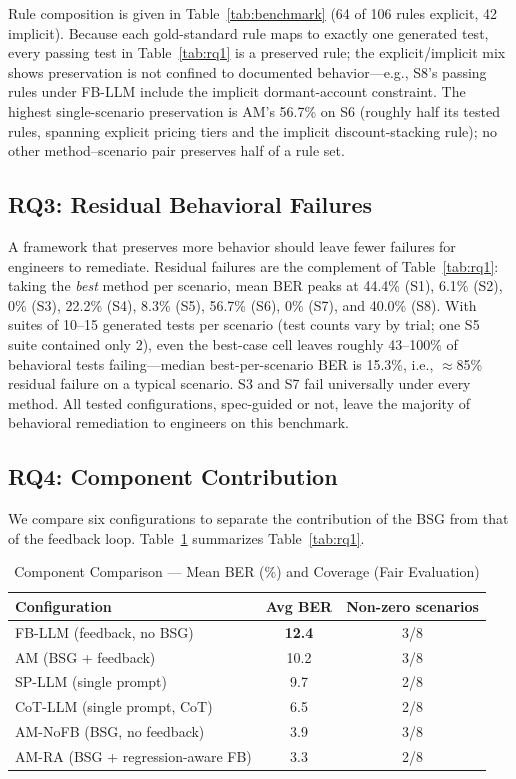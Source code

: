 \documentclass[conference]{IEEEtran}
\begin{document}
Rule composition is given in Table~\ref{tab:benchmark} (64 of 106 rules explicit, 42 implicit). Because each gold-standard rule maps to exactly one generated test, every passing test in Table~\ref{tab:rq1} is a preserved rule; the explicit/implicit mix shows preservation is not confined to documented behavior---e.g., S8's passing rules under FB-LLM include the implicit dormant-account constraint. The highest single-scenario preservation is AM's 56.7\% on S6 (roughly half its tested rules, spanning explicit pricing tiers and the implicit discount-stacking rule); no other method--scenario pair preserves half of a rule set.

\subsection{RQ3: Residual Behavioral Failures}

A framework that preserves more behavior should leave fewer failures for engineers to remediate. Residual failures are the complement of Table~\ref{tab:rq1}: taking the \emph{best} method per scenario, mean BER peaks at 44.4\% (S1), 6.1\% (S2), 0\% (S3), 22.2\% (S4), 8.3\% (S5), 56.7\% (S6), 0\% (S7), and 40.0\% (S8). With suites of 10--15 generated tests per scenario (test counts vary by trial; one S5 suite contained only 2), even the best-case cell leaves roughly 43--100\% of behavioral tests failing---median best-per-scenario BER is 15.3\%, i.e., $\approx$85\% residual failure on a typical scenario. S3 and S7 fail universally under every method. All tested configurations, spec-guided or not, leave the majority of behavioral remediation to engineers on this benchmark.

\subsection{RQ4: Component Contribution}

We compare six configurations to separate the contribution of the BSG from that of the feedback loop. Table~\ref{tab:rq4} summarizes Table~\ref{tab:rq1}.

\begin{table}[htbp]
\caption{Component Comparison --- Mean BER (\%) and Coverage (Fair Evaluation)}
\label{tab:rq4}
\centering
\footnotesize
\begin{tabular}{@{}lcc@{}}
\toprule
\textbf{Configuration} & \textbf{Avg BER} & \textbf{Non-zero scenarios} \\
\midrule
FB-LLM (feedback, no BSG) & \textbf{12.4} & 3/8 \\
AM (BSG + feedback) & 10.2 & 3/8 \\
SP-LLM (single prompt) & 9.7 & 2/8 \\
CoT-LLM (single prompt, CoT) & 6.5 & 2/8 \\
AM-NoFB (BSG, no feedback) & 3.9 & 3/8 \\
AM-RA (BSG + regression-aware FB) & 3.3 & 2/8 \\
\bottomrule
\end{tabular}
\end{table}
\end{document}
